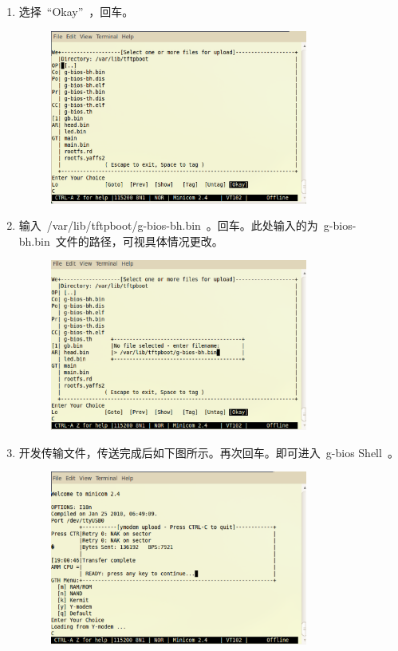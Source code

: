 \documentclass[a4paper,11pt]{book}
\begin{document}
\begin{CJK*}{UTF8}{gbsn}
\begin{enumerate}
\begin{enumerate}
\begin{figure}[H]
		\end{figure}
	\item 选择~``Okay''~，回车。
		\begin{figure}[H]
		\centering
		\includegraphics[width=0.8\textwidth]{image/min_05.eps}
		\end{figure}
	\item 输入~/var/lib/tftpboot/g-bios-bh.bin~。回车。此处输入的为~g-bios-bh.bin~文件的路径，可视具体情况更改。
		\begin{figure}[H]
		\centering
		\includegraphics[width=0.8\textwidth]{image/min_06.eps}
		\end{figure}
	\item 开发传输文件，传送完成后如下图所示。再次回车。即可进入~g-bios Shell~。
		\begin{figure}[H]
		\centering
		\includegraphics[width=0.8\textwidth]{image/min_07.eps}

\end{figure}
\end{enumerate}
\end{enumerate}
\end{CJK*}
\end{document}
